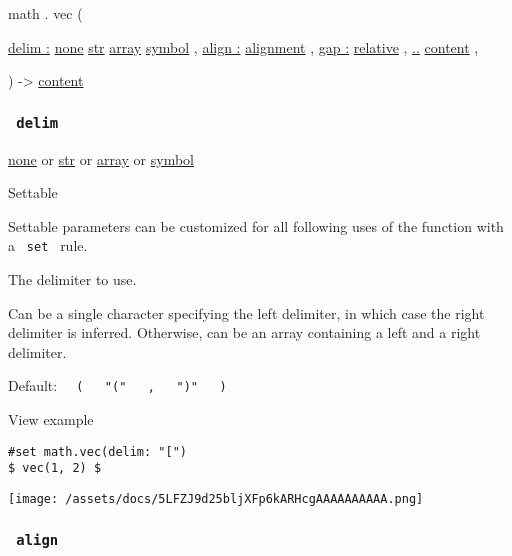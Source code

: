 math { . } { vec } (

{ \hyperref[parameters-delim]{delim :}
\href{/docs/reference/foundations/none/}{none}
\href{/docs/reference/foundations/str/}{str}
\href{/docs/reference/foundations/array/}{array}
\href{/docs/reference/symbols/symbol/}{symbol} , } {
\hyperref[parameters-align]{align :}
\href{/docs/reference/layout/alignment/}{alignment} , } {
\hyperref[parameters-gap]{gap :}
\href{/docs/reference/layout/relative/}{relative} , } {
\hyperref[parameters-children]{..}
\href{/docs/reference/foundations/content/}{content} , }

) -\textgreater{} \href{/docs/reference/foundations/content/}{content}

\subsubsection{\texorpdfstring{\texttt{\ delim\ }}{ delim }}\label{parameters-delim}

\href{/docs/reference/foundations/none/}{none} {or}
\href{/docs/reference/foundations/str/}{str} {or}
\href{/docs/reference/foundations/array/}{array} {or}
\href{/docs/reference/symbols/symbol/}{symbol}

{{ Settable }}

\label{parameters-delim-settable-tooltip}
Settable parameters can be customized for all following uses of the
function with a \texttt{\ set\ } rule.

The delimiter to use.

Can be a single character specifying the left delimiter, in which case
the right delimiter is inferred. Otherwise, can be an array containing a
left and a right delimiter.

Default:
\texttt{\ }{\texttt{\ (\ }}\texttt{\ }{\texttt{\ "("\ }}\texttt{\ }{\texttt{\ ,\ }}\texttt{\ }{\texttt{\ ")"\ }}\texttt{\ }{\texttt{\ )\ }}\texttt{\ }


View example

\begin{verbatim}
#set math.vec(delim: "[")
$ vec(1, 2) $
\end{verbatim}

\texttt{[image: /assets/docs/5LFZJ9d25bljXFp6kARHcgAAAAAAAAAA.png]}

\subsubsection{\texorpdfstring{\texttt{\ align\ }}{ align }}\label{parameters-align}

